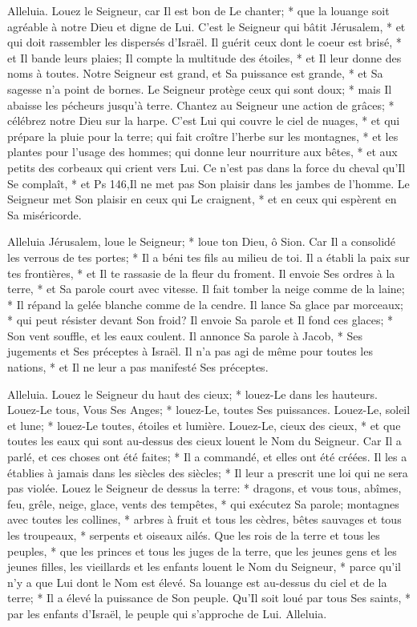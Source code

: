 Alleluia. Louez le Seigneur, car Il est bon de Le chanter; * que la louange soit agréable à notre Dieu et digne de Lui.
C'est le Seigneur qui bâtit Jérusalem, * et qui doit rassembler les dispersés d'Israël.
Il guérit ceux dont le coeur est brisé, * et Il bande leurs plaies;
Il compte la multitude des étoiles, * et Il leur donne des noms à toutes.
Notre Seigneur est grand, et Sa puissance est grande, * et Sa sagesse n'a point de bornes.
Le Seigneur protège ceux qui sont doux; * mais Il abaisse les pécheurs jusqu'à terre.
Chantez au Seigneur une action de grâces; * célébrez notre Dieu sur la harpe.
C'est Lui qui couvre le ciel de nuages, * et qui prépare la pluie pour la terre; qui fait croître l'herbe sur les montagnes, * et les plantes pour l'usage des hommes;
qui donne leur nourriture aux bêtes, * et aux petits des corbeaux qui crient vers Lui.
Ce n'est pas dans la force du cheval qu'Il Se complaît, * et
Ps 146,Il ne met pas Son plaisir dans les jambes de l'homme.
Le Seigneur met Son plaisir en ceux qui Le craignent, * et en ceux qui espèrent en Sa miséricorde.

Alleluia
Jérusalem, loue le Seigneur; * loue ton Dieu, ô Sion.
Car Il a consolidé les verrous de tes portes; * Il a béni tes fils au milieu de toi.
Il a établi la paix sur tes frontières, * et Il te rassasie de la fleur du froment.
Il envoie Ses ordres à la terre, * et Sa parole court avec vitesse.
Il fait tomber la neige comme de la laine; * Il répand la gelée blanche comme de la cendre.
Il lance Sa glace par morceaux; * qui peut résister devant Son froid?
Il envoie Sa parole et Il fond ces glaces; * Son vent souffle, et les eaux coulent.
Il annonce Sa parole à Jacob, * Ses jugements et Ses préceptes à Israël.
Il n'a pas agi de même pour toutes les nations, * et Il ne leur a pas manifesté Ses préceptes.

Alleluia. Louez le Seigneur du haut des cieux; * louez-Le dans les hauteurs.
Louez-Le tous, Vous Ses Anges; * louez-Le, toutes Ses puissances.
Louez-Le, soleil et lune; * louez-Le toutes, étoiles et lumière.
Louez-Le, cieux des cieux, * et que toutes les eaux qui sont au-dessus des cieux
louent le Nom du Seigneur. Car Il a parlé, et ces choses ont été faites; * Il a commandé, et elles ont été créées.
Il les a établies à jamais dans les siècles des siècles; * Il leur a prescrit une loi qui ne sera pas violée.
Louez le Seigneur de dessus la terre: * dragons, et vous tous, abîmes,
feu, grêle, neige, glace, vents des tempêtes, * qui exécutez Sa parole;
montagnes avec toutes les collines, * arbres à fruit et tous les cèdres,
bêtes sauvages et tous les troupeaux, * serpents et oiseaux ailés.
Que les rois de la terre et tous les peuples, * que les princes et tous les juges de la terre,
que les jeunes gens et les jeunes filles, les vieillards et les enfants louent le Nom du Seigneur, *
parce qu'il n'y a que Lui dont le Nom est élevé.
Sa louange est au-dessus du ciel et de la terre; * Il a élevé la puissance de Son peuple. Qu'Il soit loué par tous Ses saints, * par les enfants d'Israël, le peuple qui s'approche de Lui. Alleluia.

